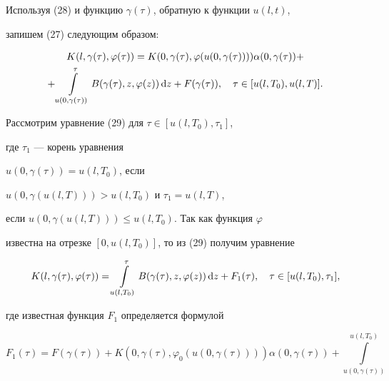 \begin{pf}
Используя (28) и функцию $\gamma (\tau)$, обратную к функции $u(l,t)$,


запишем (27) следующим образом:


\begin{multline}


K(l,\gamma (\tau ),\varphi (\tau ))


=K(0,\gamma (\tau),\varphi (u(0,\gamma (\tau ))))


\alpha (0,\gamma (\tau ))+  \\


+ \int\limits_{u(0,\gamma (\tau ))}^\tau


B(\gamma (\tau ),z,\varphi (z))\d z +F(\gamma (\tau


)),\q \tau \in [ u(l,T_0),u(l,T)].




\end{multline}


Рассмотрим уравнение (29) для $\tau \in [u(l,T_0),\tau_1]$,


где $\tau_1$ --- корень уравнения


$u(0,\gamma (\tau ))=u(l,T_0)$, если


$u(0,\gamma (u(l,T)))>u(l,T_0)$ и $\tau_1=u(l,T)$,


если $u(0,\gamma (u(l,T)))\leq u(l,T_0)$. Так как функция $\varphi$


известна на отрезке $[0,u(l,T_0)]$, то из (29) получим уравнение


\begin{equation}


K(l,\gamma (\tau ),\varphi (\tau ))=


\int\limits_{u(l,T_0)}^\tau B(\gamma (\tau ),z,\varphi


(z))\d


z+F_1(\tau ),


\q \tau \in [ u(l,T_0),\tau_1],




\end{equation}


где известная функция $F_1$ определяется формулой


\begin{equation}


F_1(\tau )=F(\gamma (\tau ))+K(0,\gamma (\tau ),\varphi_0


(u(0,\gamma (\tau ))))


\alpha (0,\gamma (\tau ))


+\int\limits_{u(0,\gamma (\tau ))}^{u(l,T_0)}



\end{equation}
\end{pf}
